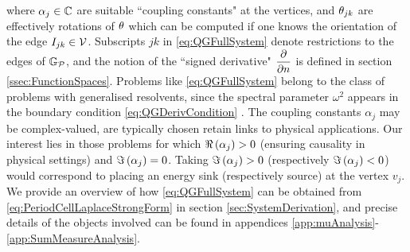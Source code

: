 where $\alpha_j\in\mathbb{C}$ are suitable ``coupling constants" at the vertices, and $\theta_{jk}$ are effectively rotations of $\theta$ which can be computed if one knows the orientation of the edge $I_{jk}\in\mathcal{V}$.
Subscripts $jk$ in \eqref{eq:QGFullSystem} denote restrictions to the edges of $\mathbb{G}_{\mathcal{P}}$, and the notion of the ``signed derivative" $\dfrac{\partial }{\partial n}$ is defined in section \ref{ssec:FunctionSpaces}.
Problems like \eqref{eq:QGFullSystem} belong to the class of problems with generalised resolvents, since the spectral parameter $\omega^2$ appears in the boundary condition \eqref{eq:QGDerivCondition} \cite{strauss1954generalized, strauss1968extensions, strauss1998functional, cherednichenko2018effective}.
The coupling constants $\alpha_j$ may be complex-valued, are typically chosen retain links to physical applications.
Our interest lies in those problems for which $\Re\left( \alpha_j \right)>0$ (ensuring causality in physical settings) and $\Im\left( \alpha_j \right)=0$.
Taking $\Im\left( \alpha_j \right)>0$ (respectively $\Im\left( \alpha_j \right)<0$) would correspond to placing an energy sink (respectively source) at the vertex $v_j$.
We provide an overview of how \eqref{eq:QGFullSystem} can be obtained from \eqref{eq:PeriodCellLaplaceStrongForm} in section \ref{sec:SystemDerivation}, and precise details of the objects involved can be found in appendices \ref{app:muAnalysis}-\ref{app:SumMeasureAnalysis}.